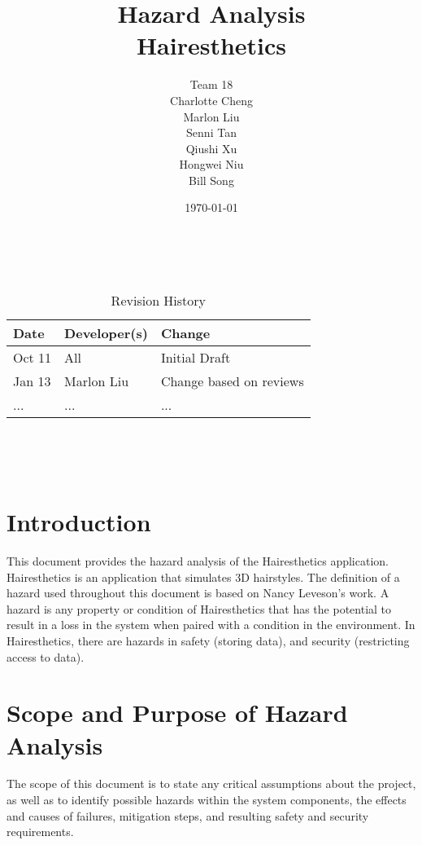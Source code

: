 \documentclass{article}
\title{Hazard Analysis\\Hairesthetics}
\author{Team 18 \\ Charlotte Cheng
        \\ Marlon Liu
        \\ Senni Tan
        \\ Qiushi Xu
        \\ Hongwei Niu
        \\ Bill Song
}
\date{\today}
\begin{document}
\maketitle
\thispagestyle{empty}

~\newpage


\begin{table}[hp]
\caption{Revision History} \label{TblRevisionHistory}
\begin{tabularx}{\textwidth}{llX}
\toprule
\textbf{Date} & \textbf{Developer(s)} & \textbf{Change}\\
\midrule
Oct 11 & All & Initial Draft\\
Jan 13 & Marlon Liu & Change based on reviews\\
... & ... & ...\\
\bottomrule
\end{tabularx}
\end{table}

~\newpage

\tableofcontents
\listoftables

~\newpage



\section{Introduction}

This document provides the hazard analysis of the Hairesthetics application. Hairesthetics is an application that simulates 3D hairstyles. The definition of a hazard used throughout this document is based on Nancy Leveson's work. A hazard is any property or condition of Hairesthetics that has the potential to result in a loss in the system when paired with a condition in the environment. In Hairesthetics, there are hazards in safety (storing data), and security (restricting access to data). 

\section{Scope and Purpose of Hazard Analysis}
The scope of this document is to state any critical assumptions about the project, as well as to identify possible hazards within the system components, the effects and causes of failures, mitigation steps, and resulting safety and security requirements.
\end{document}
